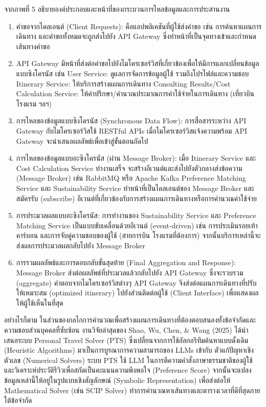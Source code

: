 จากภาพที่ 5 อธิบายองค์ประกอบและหน้าที่ของกระบวนการไหลข้อมูลและการประสานงาน

\begin{enumerate}[leftmargin=1.5cm]
\item คำขอจากไคลเอนต์ (Client Requests): คือแอปพลิเคชันที่ผู้ใช้ส่งคำขอ เช่น การค้นหาแผนการเดินทาง และคำขอทั้งหมดจะถูกส่งไปยัง API Gateway ซึ่งทำหน้าที่เป็นจุดทางเข้าและกำหนดเส้นทางคำขอ
\item API Gateway มีหน้าที่ส่งต่อคำขอไปยังไมโครเซอร์วิสที่เกี่ยวข้องเพื่อให้มีการแลกเปลี่ยนข้อมูลแบบซิงโครนัส เช่น User Service: ดูแลการจัดการข้อมูลผู้ใช้ รวมถึงโปรไฟล์และความชอบ Itinerary Service: ให้บริการสร้างแผนการเดินทาง Consulting Results/Cost Calculation Service: ให้คำปรึกษา/คำนวณประมาณการค่าใช้จ่ายในการเดินทาง (เที่ยวบิน โรงแรม ฯลฯ)
\item การไหลของข้อมูลแบบซิงโครนัส (Synchronous Data Flow): การสื่อสารระหว่าง API Gateway กับไมโครเซอร์วิสใช้ RESTful APIs เมื่อไมโครเซอร์วิสแจ้งความพร้อม API Gateway จะนำเสนอผลลัพธ์เพื่อเข้าสู่ขั้นตอนถัดไป
\item การไหลของข้อมูลแบบอะซิงโครนัส (ผ่าน Message Broker): เมื่อ Itinerary Service และ Cost Calculation Service ทำงานเสร็จ จะสร้างอีเวนต์และส่งไปยังตัวกลางส่งข้อความ (Message Broker) เช่น RabbitMQ หรือ Apache Kafka Preference Matching Service และ Sustainability Service ทำหน้าที่เป็นไคลเอนต์ของ Message Broker และสมัครรับ (subscribe) อีเวนต์ที่เกี่ยวข้องกับการสร้างแผนการเดินทางหรือการคำนวณค่าใช้จ่าย
\item การประมวลผลแบบอะซิงโครนัส: การทำงานของ Sustainability Service และ Preference Matching Service เป็นแบบขับเคลื่อนด้วยอีเวนต์ (event-driven) เช่น การประเมินรอยเท้าคาร์บอน และการจับคู่ความชอบของผู้ใช้ (สายการบิน โรงแรมที่ต้องการ) จากนั้นบริการเหล่านี้จะส่งผลการประมวลผลกลับไปยัง Message Broker
\item การรวมผลลัพธ์และการตอบกลับขั้นสุดท้าย (Final Aggregation and Response): Message Broker ส่งต่อผลลัพธ์ที่ประมวลแล้วกลับไปยัง API Gateway ซึ่งจะรวบรวม (aggregate) คำตอบจากไมโครเซอร์วิสต่างๆ API Gateway จึงส่งต่อแผนการเดินทางที่ปรับให้เหมาะสม (optimized itinerary) ไปยังส่วนติดต่อผู้ใช้ (Client Interface) เพื่อแสดงผลให้ผู้ใช้เห็นในที่สุด
\end{enumerate}

อย่างไรก็ตาม ในส่วนของกลไกการคำนวณเพื่อสร้างแผนการเดินทางที่ต้องตอบสนองทั้งข้อจำกัดและความชอบส่วนบุคคลที่ซับซ้อน งานวิจัยล่าสุดของ Shao, Wu, Chen, \& Wang (2025) ได้นำเสนอระบบ Personal Travel Solver (PTS) ซึ่งเปลี่ยนจากการใช้อัลกอริทึมค้นหาแบบดั้งเดิม (Heuristic Algorithms) มาเป็นการบูรณาการความสามารถของ LLMs เข้ากับ ตัวแก้ปัญหาเชิงตัวเลข (Numerical Solvers) ระบบ PTS ใช้ LLM ในการตีความคำสั่งภาษาธรรมชาติของผู้ใช้และวิเคราะห์ประวัติรีวิวเพื่อสกัดเป็นคะแนนความพึงพอใจ (Preference Score) จากนั้นจะแปลงข้อมูลเหล่านี้ให้อยู่ในรูปแบบเชิงสัญลักษณ์ (Symbolic Representation) เพื่อส่งต่อให้ Mathematical Solver (เช่น SCIP Solver) ทำการคำนวณหาเส้นทางและตารางเวลาที่ดีที่สุดภายใต้ข้อจำกัด


